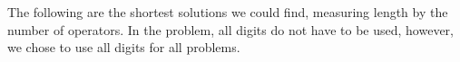 The following are the shortest solutions we could find, measuring length by the number of operators.
In the problem, all digits do not have to be used, however, we chose to use all digits for all problems.
